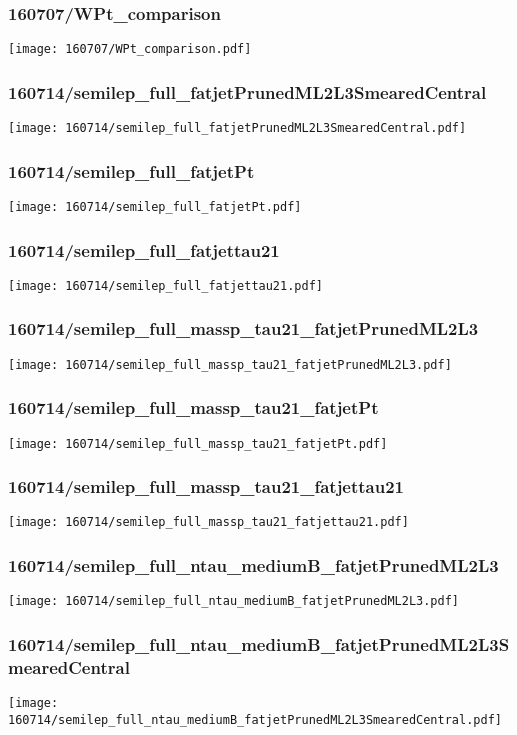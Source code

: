 \begin{frame}
   \frametitle{\small 160707/WPt\_comparison}
   \centering
   \texttt{[image: 160707/WPt\_comparison.pdf]}
\end{frame}

\begin{frame}
   \frametitle{\small 160714/semilep\_full\_fatjetPrunedML2L3SmearedCentral}
   \centering
   \texttt{[image: 160714/semilep\_full\_fatjetPrunedML2L3SmearedCentral.pdf]}
\end{frame}

\begin{frame}
   \frametitle{\small 160714/semilep\_full\_fatjetPt}
   \centering
   \texttt{[image: 160714/semilep\_full\_fatjetPt.pdf]}
\end{frame}

\begin{frame}
   \frametitle{\small 160714/semilep\_full\_fatjettau21}
   \centering
   \texttt{[image: 160714/semilep\_full\_fatjettau21.pdf]}
\end{frame}

\begin{frame}
   \frametitle{\small 160714/semilep\_full\_massp\_tau21\_fatjetPrunedML2L3}
   \centering
   \texttt{[image: 160714/semilep\_full\_massp\_tau21\_fatjetPrunedML2L3.pdf]}
\end{frame}

\begin{frame}
   \frametitle{\small 160714/semilep\_full\_massp\_tau21\_fatjetPt}
   \centering
   \texttt{[image: 160714/semilep\_full\_massp\_tau21\_fatjetPt.pdf]}
\end{frame}

\begin{frame}
   \frametitle{\small 160714/semilep\_full\_massp\_tau21\_fatjettau21}
   \centering
   \texttt{[image: 160714/semilep\_full\_massp\_tau21\_fatjettau21.pdf]}
\end{frame}

\begin{frame}
   \frametitle{\small 160714/semilep\_full\_ntau\_mediumB\_fatjetPrunedML2L3}
   \centering
   \texttt{[image: 160714/semilep\_full\_ntau\_mediumB\_fatjetPrunedML2L3.pdf]}
\end{frame}

\begin{frame}
   \frametitle{\small 160714/semilep\_full\_ntau\_mediumB\_fatjetPrunedML2L3SmearedCentral}
   \centering
   \texttt{[image: 160714/semilep\_full\_ntau\_mediumB\_fatjetPrunedML2L3SmearedCentral.pdf]}
\end{frame}

